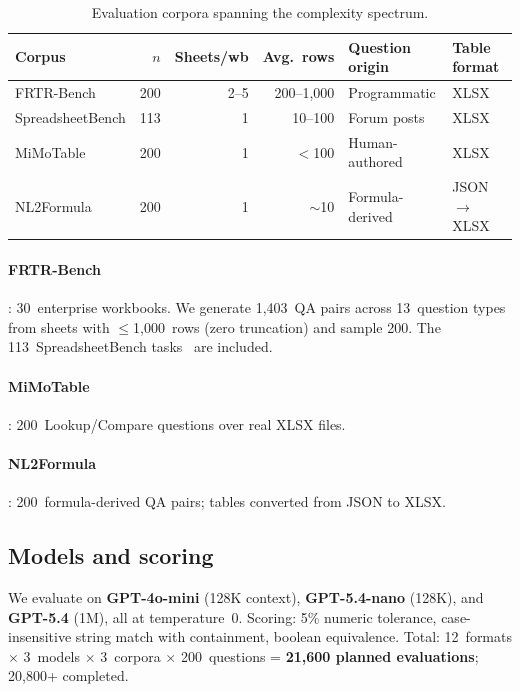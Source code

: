 \documentclass[11pt]{article}
\begin{document}
\begin{table}[t]
\centering
\caption{Evaluation corpora spanning the complexity spectrum.}
\label{tab:corpora}
\small
\begin{tabular}{lrrrll}
\toprule
\textbf{Corpus} & $n$ & \textbf{Sheets/wb} & \textbf{Avg.\ rows} & \textbf{Question origin} & \textbf{Table format} \\
\midrule
FRTR-Bench          & 200 & 2--5  & 200--1,000 & Programmatic    & XLSX \\
SpreadsheetBench    & 113 & 1     & 10--100    & Forum posts     & XLSX \\
MiMoTable           & 200 & 1     & $<$100     & Human-authored  & XLSX \\
NL2Formula          & 200 & 1     & $\sim$10   & Formula-derived & JSON$\to$XLSX \\
\bottomrule
\end{tabular}
\end{table}

\paragraph{FRTR-Bench} \citep{gulati2025frtr}: 30~enterprise workbooks. We generate 1,403~QA pairs across 13~question types from sheets with $\leq$1,000~rows (zero truncation) and sample 200. The 113~SpreadsheetBench tasks~\citep{ma2024spreadsheetbench} are included.

\paragraph{MiMoTable} \citep{li2024mimotable}: 200~Lookup/Compare questions over real XLSX files.

\paragraph{NL2Formula} \citep{zhao2024nl2formula}: 200~formula-derived QA pairs; tables converted from JSON to XLSX.

\subsection{Models and scoring}

We evaluate on \textbf{GPT-4o-mini} (128K context), \textbf{GPT-5.4-nano} (128K), and \textbf{GPT-5.4} (1M), all at temperature~0.
Scoring: 5\% numeric tolerance, case-insensitive string match with containment, boolean equivalence.
Total: 12~formats $\times$ 3~models $\times$ 3~corpora $\times$ 200~questions = \textbf{21,600 planned evaluations}; 20,800+ completed.
\end{document}
